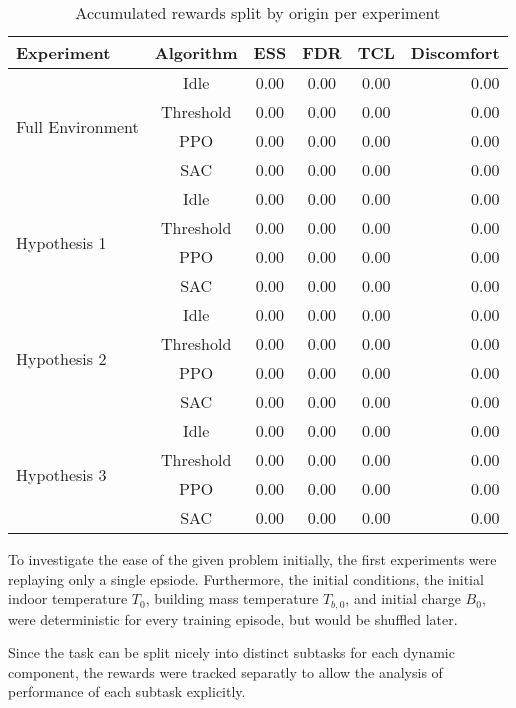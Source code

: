 \begin{table*}[t]
\label{tab:experiments}
\caption{Accumulated rewards split by origin per experiment}
\vskip 0.15in
\begin{center}
\begin{small}
\begin{sc}
\begin{tabular}{lccccr}
\toprule
Experiment & Algorithm & ESS & FDR & TCL & Discomfort \\
\midrule
\multirow{4}{*}{Full Environment} & Idle & 0.00 & 0.00 & 0.00 & 0.00 \\
& Threshold & 0.00 & 0.00 & 0.00 & 0.00 \\
& PPO & 0.00 & 0.00 & 0.00 & 0.00 \\
& SAC & 0.00 & 0.00 & 0.00 & 0.00 \\
\multirow{4}{*}{Hypothesis 1} & Idle & 0.00 & 0.00 & 0.00 & 0.00 \\
& Threshold & 0.00 & 0.00 & 0.00 & 0.00 \\
& PPO & 0.00 & 0.00 & 0.00 & 0.00 \\
& SAC & 0.00 & 0.00 & 0.00 & 0.00 \\
\multirow{4}{*}{Hypothesis 2} & Idle & 0.00 & 0.00 & 0.00 & 0.00 \\
& Threshold & 0.00 & 0.00 & 0.00 & 0.00 \\
& PPO & 0.00 & 0.00 & 0.00 & 0.00 \\
& SAC & 0.00 & 0.00 & 0.00 & 0.00 \\
\multirow{4}{*}{Hypothesis 3} & Idle & 0.00 & 0.00 & 0.00 & 0.00 \\
& Threshold & 0.00 & 0.00 & 0.00 & 0.00 \\
& PPO & 0.00 & 0.00 & 0.00 & 0.00 \\
& SAC & 0.00 & 0.00 & 0.00 & 0.00 \\
\bottomrule
\end{tabular}
\end{sc}
\end{small}
\end{center}
\vskip -0.1in
\end{table*}
To investigate the ease of the given problem initially, the first experiments were replaying only a single epsiode. Furthermore, the initial conditions, the initial indoor temperature $T_0$, building mass temperature $T_{b,0}$, and initial charge $B_0$, were deterministic for every training episode, but would be shuffled later.
\par
Since the task can be split nicely into distinct subtasks for each dynamic component, the rewards were tracked separatly to allow the analysis of performance of each subtask explicitly.
